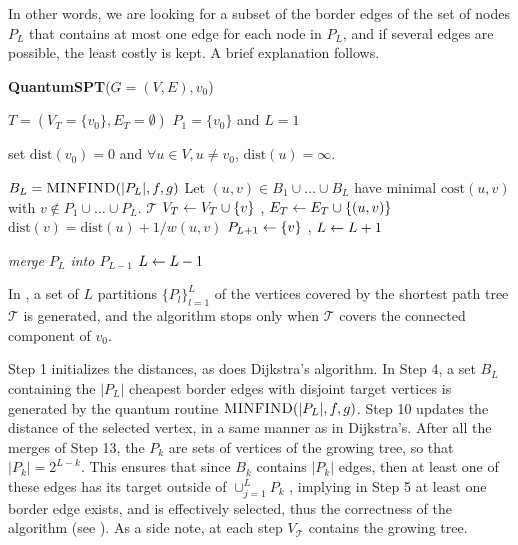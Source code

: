 In other words, we are looking for a subset of the border edges of the set of nodes $P_L$ that contains at most one edge for 
each node in $P_L$, and if several edges are possible, the least costly is kept. A brief explanation follows.

\begin{algorithm}[H]
\caption{\textbf{QuantumSPT}($G=(V,E),v_0$)}\label{alg:quantum_spt}
\begin{algorithmic}[1]
    \Require $T =( V_T=\{v_0\}, E_T =\emptyset) $ 
    \Require $P_1 = \{v_0\}$ and $L=1$
    
    \State  set $\text{dist}(v_0) = 0$ and $\forall u\in V, u \neq v_0$, $\text{dist}(u) = \infty$. 
    
    \State {}
    \State $B_L = \textsc{MINFIND}(|P_L|,f,g)$ 
    \State Let $(u,v) \in B_1 \cup \dots \cup B_L$ have minimal $\text{cost}(u,v)$ with $v\notin P_1 \cup \dots \cup P_L$. 
    \State \Return $\mathcal{T}$
    \Else 
    \State $V_T \leftarrow V_T \cup \{v\}$ , $E_T \leftarrow E_T \cup \{(u,v)\}$ 
    \State $\text{dist}(v) = \text{dist}(u) + 1/w(u,v)$
    \State $P_{L+1} \leftarrow \{v\}$ , $L\leftarrow L+1$
    \EndIf
    
    \State \textit{merge $P_L$ into $P_{L-1}$}
    \State $L \leftarrow L-1$
    
    \EndWhile
    \EndWhile
\end{algorithmic}
\end{algorithm}

In , a set of $L$ partitions $\{P_l\}_{l=1}^L$ of the vertices covered by the shortest path tree $\mathcal T$ is generated, and the algorithm stops only when $\mathcal T$ covers the connected component of $v_0$.

Step 1 initializes the distances, as does Dijkstra's algorithm. In Step 4, a set
$B_L$ containing the $|P_L|$ cheapest border edges with disjoint target vertices
is generated by the quantum routine $\textsc{MINFIND}(|P_L|,f,g)$. Step 10
updates the distance of the selected vertex, in a same manner as in Dijkstra's.
After all the merges of Step 13, the $P_k$ are sets of vertices of the growing
tree, so that $|P_k| = 2^{L-k}$. This ensures that since $B_k$ contains $|P_k|$
edges, then at least one of these edges has its target outside of $\cup_{j=1}^L
P_k$ , implying in Step 5 at least one border edge exists, and is
effectively selected, thus the correctness of the algorithm (see \cite[Appendix
A, Proposition 5]{apers_quantum_2019}).
As a side note, at each step $V_{\mathcal{T}}$ contains the growing tree.

